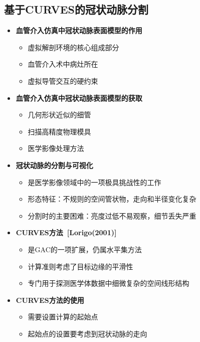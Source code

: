 \subsection[冠状动脉分割I]{基于CURVES的冠状动脉分割}

\begin{frame}
\begin{itemize}
\item \textbf{血管介入仿真中冠状动脉表面模型的作用}
\begin{itemize}
\item 虚拟解剖环境的核心组成部分
\item 血管介入术中病灶所在
\item 虚拟导管交互的硬约束
\end{itemize}
\pause \item \textbf{血管介入仿真中冠状动脉表面模型的获取}
\begin{itemize}
\item 几何形状近似的细管
\item 扫描高精度物理模具
\item 医学影像处理方法
\end{itemize}
\pause \item \textbf{冠状动脉的分割与可视化}
\begin{itemize}
\item 是医学影像领域中的一项极具挑战性的工作
\item 形态特征：不规则的空间管状物，走向和半径变化复杂
\item 分割时的主要困难：亮度过低不易观察，细节丢失严重
\end{itemize}
\end{itemize}
\end{frame}

\begin{frame}
\begin{itemize}
\item \textbf{CURVES方法~[Lorigo(2001)]}
\begin{itemize}
\item 是GAC的一项扩展，仍属水平集方法
\item 计算准则考虑了目标边缘的平滑性
\item 专门用于探测医学体数据中细微复杂的空间线形结构
\end{itemize}
\pause \item \textbf{CURVES方法的使用}
\begin{itemize}
\item 需要设置计算的起始点
\item 起始点的设置要考虑到冠状动脉的走向
\end{itemize}
\end{itemize}
\end{frame}


